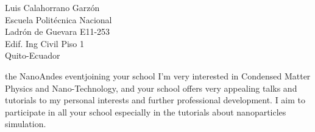\documentclass{letter}
\begin{document}
\begin{letter}{Luis Calahorrano Garzón\\
Escuela Politécnica Nacional\\
Ladrón de Guevara E11-253\\
Edif. Ing Civil Piso 1\\
Quito-Ecuador}

\begin{content}{the NanoAndes event}{joining your school}
I'm very interested in Condensed Matter Physics and Nano-Technology,
and your school offers very appealing talks and tutorials to my
personal interests and further professional development. I aim to
participate in all your school especially in the tutorials about
nanoparticles simulation.

\end{content}

\end{letter}
\end{document}

